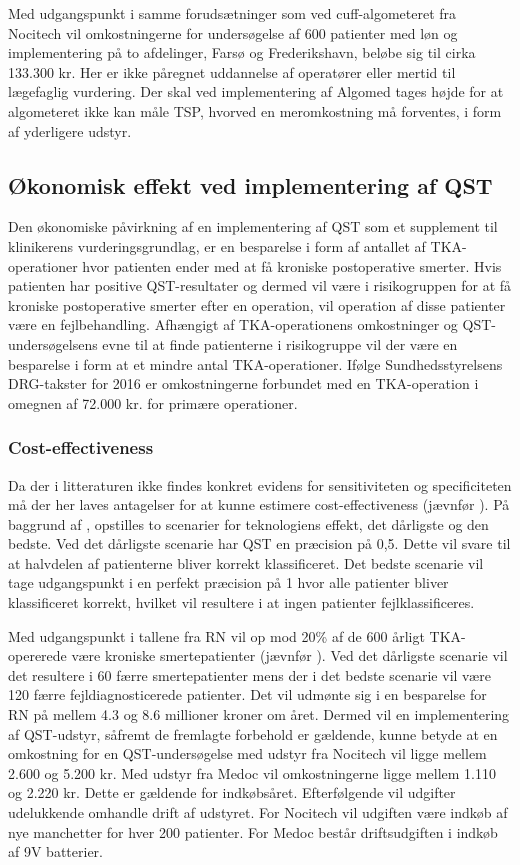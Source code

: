 Med udgangspunkt i samme forudsætninger som ved cuff-algometeret fra Nocitech vil omkostningerne for undersøgelse af 600 patienter med løn og implementering på to afdelinger, Farsø og Frederikshavn, beløbe sig til cirka 133.300 kr. Her er ikke påregnet uddannelse af operatører eller mertid til lægefaglig vurdering. Der skal ved implementering af Algomed tages højde for at algometeret  ikke kan måle TSP, hvorved en meromkostning må forventes, i form af yderligere udstyr.

\subsection{Økonomisk effekt ved implementering af QST}
Den økonomiske påvirkning af en implementering af QST som et supplement til klinikerens vurderingsgrundlag, er en besparelse i form af antallet af TKA-operationer hvor patienten ender med at få kroniske postoperative smerter. Hvis patienten har positive QST-resultater og dermed vil være i risikogruppen for at få kroniske postoperative smerter efter en operation, vil operation af disse patienter være en fejlbehandling. Afhængigt af TKA-operationens omkostninger og QST-undersøgelsens evne til at finde patienterne i risikogruppe vil der være en besparelse i form at et mindre antal TKA-operationer. Ifølge Sundhedsstyrelsens DRG-takster for 2016 er omkostningerne forbundet med en TKA-operation i omegnen af 72.000 kr. for primære operationer. \citep{Takst2016}

\subsubsection{Cost-effectiveness}
Da der i litteraturen ikke findes konkret evidens for sensitiviteten og specificiteten må der her laves antagelser for at kunne estimere cost-effectiveness (jævnfør ). På baggrund af , opstilles to scenarier for teknologiens effekt, det dårligste og den bedste. Ved det dårligste scenarie har QST en præcision på 0,5. Dette vil svare til at halvdelen af patienterne bliver korrekt klassificeret. Det bedste scenarie vil tage udgangspunkt i en perfekt præcision på 1 hvor alle patienter bliver klassificeret korrekt, hvilket vil resultere i at ingen patienter fejlklassificeres.  

Med udgangspunkt i tallene fra RN vil op mod 20\% af de 600 årligt TKA-opererede være kroniske smertepatienter (jævnfør ). Ved det dårligste scenarie vil det resultere i 60 færre smertepatienter mens der i det bedste scenarie vil være 120 færre fejldiagnosticerede patienter. Det vil udmønte sig i en besparelse for RN på mellem 4.3 og 8.6 millioner kroner om året. Dermed vil en implementering af QST-udstyr, såfremt de fremlagte forbehold er gældende, kunne betyde at en omkostning for en QST-undersøgelse med udstyr fra Nocitech vil ligge mellem 2.600 og 5.200 kr. Med udstyr fra Medoc vil omkostningerne ligge mellem 1.110 og 2.220 kr. Dette er gældende for indkøbsåret. Efterfølgende vil udgifter udelukkende omhandle drift af udstyret. For Nocitech vil udgiften være indkøb af nye manchetter for hver 200 patienter. For Medoc består driftsudgiften i indkøb af 9V batterier. 

